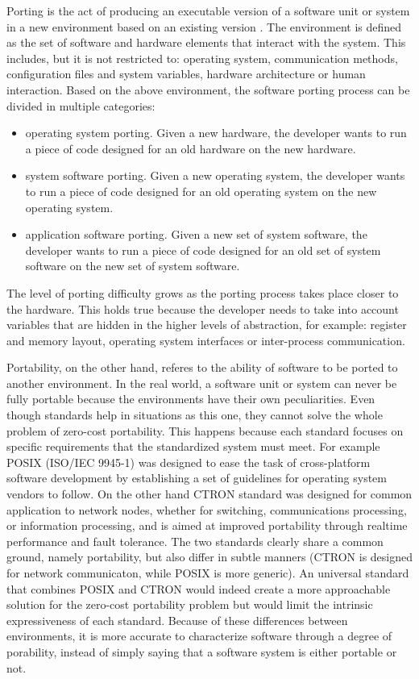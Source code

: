 \documentclass[12pt,a4paper]{report}
\begin{document}
Porting is the act of producing an executable version of a software unit or system in a new
environment based on an existing version \cite{mooney1993issues}. The environment is defined as the
set of software and hardware elements that interact with the system. This includes, but it is not
restricted to: operating system, communication methods, configuration files and system variables,
hardware architecture or human interaction. Based on the above environment, the software porting
process can be divided in multiple categories:
\begin{itemize}
	\item operating system porting. Given a new hardware, the developer wants to run a piece of
		code designed for an old hardware on the new hardware.
	\item system software porting. Given a new operating system, the developer wants to run a
		piece of code designed for an old operating system on the new operating system.
	\item application software porting. Given a new set of system software, the developer wants
		to run a piece of code designed for an old set of system software on the new set of
		system software.
\end{itemize}
The level of porting difficulty grows as the porting process takes place closer to the hardware. This
holds true because the developer needs to take into account variables that are hidden in the higher
levels of abstraction, for example: register and memory layout, operating system interfaces or
inter-process communication.

Portability, on the other hand, referes to the ability of software to be ported to another
environment. In the real world, a software unit or system can never be fully portable because the
environments have their own peculiarities. Even though standards help in situations as this one,
they cannot solve the whole problem of zero-cost portability. This happens because each standard
focuses on specific requirements that the standardized system must meet. For example POSIX
(ISO/IEC 9945-1) was designed to ease the task of cross-platform software development by
establishing a set of guidelines for operating system vendors to follow. On the other hand CTRON
standard \cite{wasano1989application} was designed for common application to network nodes, whether
for switching, communications
processing, or information processing, and is aimed at improved portability through realtime
performance and fault tolerance. The two standards clearly share a common ground, namely portability,
but also differ in subtle manners (CTRON is designed for network communicaton, while POSIX is more
generic). An universal standard that combines POSIX and CTRON would indeed create a more approachable
solution for the zero-cost portability problem but would limit the intrinsic expressiveness of
each standard. Because of these differences between environments, it is more accurate to characterize
software through a degree of porability, instead of simply saying that a software system is either
portable or not.
\end{document}
